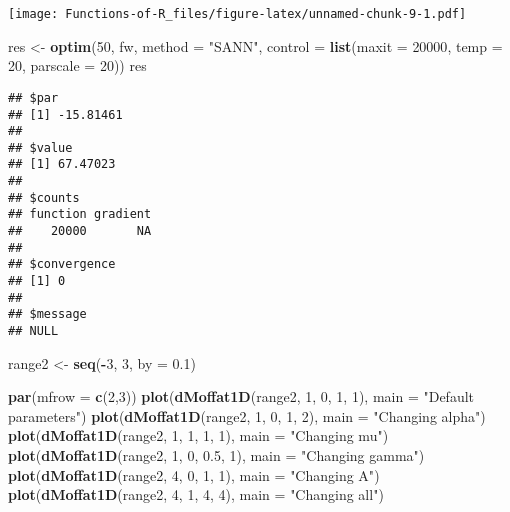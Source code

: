 \documentclass[
]{article}
\newenvironment{Shaded}{\begin{snugshade}}{\end{snugshade}}
\newcommand{\AttributeTok}[1]{\textcolor[rgb]{0.13,0.29,0.53}{#1}}
\newcommand{\DecValTok}[1]{\textcolor[rgb]{0.00,0.00,0.81}{#1}}
\newcommand{\FloatTok}[1]{\textcolor[rgb]{0.00,0.00,0.81}{#1}}
\newcommand{\FunctionTok}[1]{\textcolor[rgb]{0.13,0.29,0.53}{\textbf{#1}}}
\newcommand{\NormalTok}[1]{#1}
\newcommand{\OtherTok}[1]{\textcolor[rgb]{0.56,0.35,0.01}{#1}}
\newcommand{\SpecialCharTok}[1]{\textcolor[rgb]{0.81,0.36,0.00}{\textbf{#1}}}
\newcommand{\StringTok}[1]{\textcolor[rgb]{0.31,0.60,0.02}{#1}}
\begin{document}
\texttt{[image: Functions-of-R\_files/figure-latex/unnamed-chunk-9-1.pdf]}

\begin{Shaded}
\begin{Highlighting}[]
\NormalTok{res }\OtherTok{\textless{}{-}} \FunctionTok{optim}\NormalTok{(}\DecValTok{50}\NormalTok{, fw, }\AttributeTok{method =} \StringTok{"SANN"}\NormalTok{,}
             \AttributeTok{control =} \FunctionTok{list}\NormalTok{(}\AttributeTok{maxit =} \DecValTok{20000}\NormalTok{, }\AttributeTok{temp =} \DecValTok{20}\NormalTok{, }\AttributeTok{parscale =} \DecValTok{20}\NormalTok{))}
\NormalTok{res}
\end{Highlighting}
\end{Shaded}

\begin{verbatim}
## $par
## [1] -15.81461
## 
## $value
## [1] 67.47023
## 
## $counts
## function gradient 
##    20000       NA 
## 
## $convergence
## [1] 0
## 
## $message
## NULL
\end{verbatim}

\begin{Shaded}
\begin{Highlighting}[]
\NormalTok{range2 }\OtherTok{\textless{}{-}} \FunctionTok{seq}\NormalTok{(}\SpecialCharTok{{-}}\DecValTok{3}\NormalTok{, }\DecValTok{3}\NormalTok{, }\AttributeTok{by =} \FloatTok{0.1}\NormalTok{)}

\FunctionTok{par}\NormalTok{(}\AttributeTok{mfrow =} \FunctionTok{c}\NormalTok{(}\DecValTok{2}\NormalTok{,}\DecValTok{3}\NormalTok{))}
\FunctionTok{plot}\NormalTok{(}\FunctionTok{dMoffat1D}\NormalTok{(range2, }\DecValTok{1}\NormalTok{, }\DecValTok{0}\NormalTok{, }\DecValTok{1}\NormalTok{, }\DecValTok{1}\NormalTok{), }\AttributeTok{main =} \StringTok{"Default parameters"}\NormalTok{)}
\FunctionTok{plot}\NormalTok{(}\FunctionTok{dMoffat1D}\NormalTok{(range2, }\DecValTok{1}\NormalTok{, }\DecValTok{0}\NormalTok{, }\DecValTok{1}\NormalTok{, }\DecValTok{2}\NormalTok{), }\AttributeTok{main =} \StringTok{"Changing alpha"}\NormalTok{)}
\FunctionTok{plot}\NormalTok{(}\FunctionTok{dMoffat1D}\NormalTok{(range2, }\DecValTok{1}\NormalTok{, }\DecValTok{1}\NormalTok{, }\DecValTok{1}\NormalTok{, }\DecValTok{1}\NormalTok{), }\AttributeTok{main =} \StringTok{"Changing mu"}\NormalTok{)}
\FunctionTok{plot}\NormalTok{(}\FunctionTok{dMoffat1D}\NormalTok{(range2, }\DecValTok{1}\NormalTok{, }\DecValTok{0}\NormalTok{, }\FloatTok{0.5}\NormalTok{, }\DecValTok{1}\NormalTok{), }\AttributeTok{main =} \StringTok{"Changing gamma"}\NormalTok{)}
\FunctionTok{plot}\NormalTok{(}\FunctionTok{dMoffat1D}\NormalTok{(range2, }\DecValTok{4}\NormalTok{, }\DecValTok{0}\NormalTok{, }\DecValTok{1}\NormalTok{, }\DecValTok{1}\NormalTok{), }\AttributeTok{main =} \StringTok{"Changing A"}\NormalTok{)}
\FunctionTok{plot}\NormalTok{(}\FunctionTok{dMoffat1D}\NormalTok{(range2, }\DecValTok{4}\NormalTok{, }\DecValTok{1}\NormalTok{, }\DecValTok{4}\NormalTok{, }\DecValTok{4}\NormalTok{), }\AttributeTok{main =} \StringTok{"Changing all"}\NormalTok{)}
\end{Highlighting}
\end{Shaded}
\end{document}
